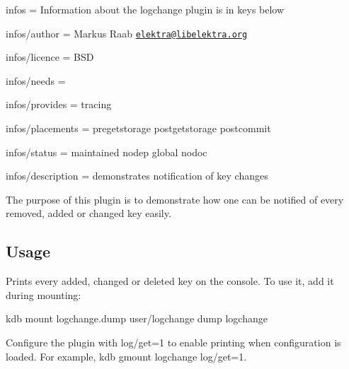 
\begin{DoxyItemize}
\item infos = Information about the logchange plugin is in keys below
\item infos/author = Markus Raab \href{mailto:elektra@libelektra.org}{\tt elektra@libelektra.\+org}
\item infos/licence = B\+SD
\item infos/needs =
\item infos/provides = tracing
\item infos/placements = pregetstorage postgetstorage postcommit
\item infos/status = maintained nodep global nodoc
\item infos/description = demonstrates notification of key changes
\end{DoxyItemize}

The purpose of this plugin is to demonstrate how one can be notified of every removed, added or changed key easily.

\subsection*{Usage}

Prints every added, changed or deleted key on the console. To use it, add it during mounting\+:


\begin{DoxyCode}
kdb mount logchange.dump user/logchange dump logchange
\end{DoxyCode}


Configure the plugin with {\ttfamily log/get=1} to enable printing when configuration is loaded. For example, {\ttfamily kdb gmount logchange log/get=1}. 